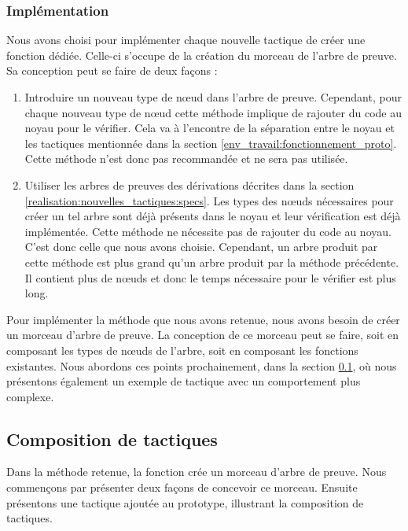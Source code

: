 \documentclass[french,titlepage]{article}
\begin{document}
\subsubsection{Implémentation} \label{realisation:nouvelles_tactiques:implémentation}
Nous avons choisi pour implémenter chaque nouvelle tactique de créer une fonction dédiée. Celle-ci s'occupe de la création du morceau de l'arbre de preuve. Sa conception peut se faire de deux façons :
\begin{enumerate}
    \item Introduire un nouveau type de nœud dans l'arbre de preuve. Cependant, pour chaque nouveau type de nœud cette méthode implique de rajouter du code au noyau pour le vérifier. Cela va à l'encontre de la séparation entre le noyau et les tactiques mentionnée dans la section \ref{env_travail:fonctionnement_proto}. Cette méthode n'est donc pas recommandée et ne sera pas utilisée.
    \item Utiliser les arbres de preuves des dérivations décrites dans la section \ref{realisation:nouvelles_tactiques:specs}. Les types des nœuds nécessaires pour créer un tel arbre sont déjà présents dans le noyau et leur vérification est déjà implémentée. Cette méthode ne nécessite pas de rajouter du code au noyau. C'est donc celle que nous avons choisie. Cependant, un arbre produit par cette méthode est plus grand qu'un arbre produit par la méthode précédente. Il contient plus de nœuds et donc le temps nécessaire pour le vérifier est plus long.
\end{enumerate}

Pour implémenter la méthode que nous avons retenue, nous avons besoin de créer un morceau d'arbre de preuve. La conception de ce morceau peut se faire, soit en composant les types de nœuds de l'arbre, soit en composant les fonctions existantes. Nous abordons ces points prochainement, dans la section \ref{realisation:composition_tactiques}, où nous présentons également un exemple de tactique avec un comportement plus complexe.

\subsection{Composition de tactiques} \label{realisation:composition_tactiques}
Dans la méthode retenue, la fonction crée un morceau d'arbre de preuve.
Nous commençons par présenter deux façons de concevoir ce morceau. Ensuite présentons une tactique ajoutée au prototype, illustrant la composition de tactiques.
\end{document}
